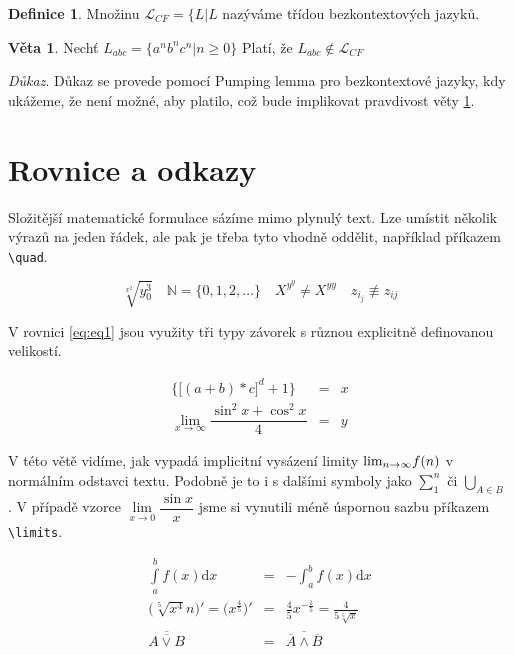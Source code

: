 \documentclass[11pt,twocolumn,a4paper]{article}
\theoremstyle{definition}
\newtheorem{definition}{Definice}[section]
\newtheorem{sentence}{Věta}
\begin{document}
\begin{definition}
Množinu $\mathcal{L}_{CF}=\{L|L$ nazýváme třídou bezkontextových jazyků.
\end{definition}

\begin{sentence}
\label{def:sentence}
Nechť $L_{abc} = \{a^nb^nc^n|n \geq 0 \}$ Platí, že $L_{abc} \notin \mathcal{L}_{CF}$
\end{sentence} 

\emph{Důkaz}. Důkaz se provede pomocí Pumping lemma pro bezkontextové jazyky, kdy ukážeme, že není možné, aby platilo, což bude implikovat pravdivost věty \ref{def:sentence}.

\section{Rovnice a odkazy}

Složitější matematické formulace sázíme mimo plynulý text. Lze umístit několik výrazů na jeden řádek, ale pak je třeba tyto vhodně oddělit, například příkazem \verb|\quad|. 

$$ \displaystyle \sqrt[x^2]{y^3_{0}} \quad \mathbb{N} = \{0,1,2, \ldots \} \quad  X^{y^y} \neq X^{yy} \quad z_{i_j} \not\equiv z_{ij}$$

V rovnici \eqref{eq:eq1} jsou využity tři typy závorek s různou explicitně definovanou velikostí.

\begin{eqnarray} \label{eq:eq1}
\bigg \{ \Big[ (a+b) * c \Big]^d + 1 \bigg \} & =  & x \\
\lim_{x \to \infty} \dfrac{\sin^2x + \cos^2x}{4} & = & y \nonumber
\end{eqnarray}

V této větě vidíme, jak vypadá implicitní vysázení limity $ \textup{lim}_{n \to \infty} f(n)$ v normálním odstavci textu. Podobně je to i s dalšími symboly jako $\sum ^n_1 $ či $\bigcup_{ A \in B}$ . V případě vzorce $\lim\limits_{x \to 0} \dfrac{\sin x}{x}$ jsme si vynutili méně úspornou sazbu příkazem \verb|\limits|.

\begin{eqnarray} 
\int\limits_a^b f(x)\mathrm{d}x & = & - \int_{a}^{b} f(x) \mathrm{d}x \\
\Big(\sqrt[5]{x^4}n \Big)' = \Big(x^{\frac{4}{5}} \Big)' & = & \frac{4}{5}x^{-\frac{1}{5}} = \frac{4}{5 \sqrt[5]{x}} \\
\overline{\overline{A \vee B }} & = & \overline{\overline{A} \wedge \overline{B}} 
\end{eqnarray}
\end{document}
